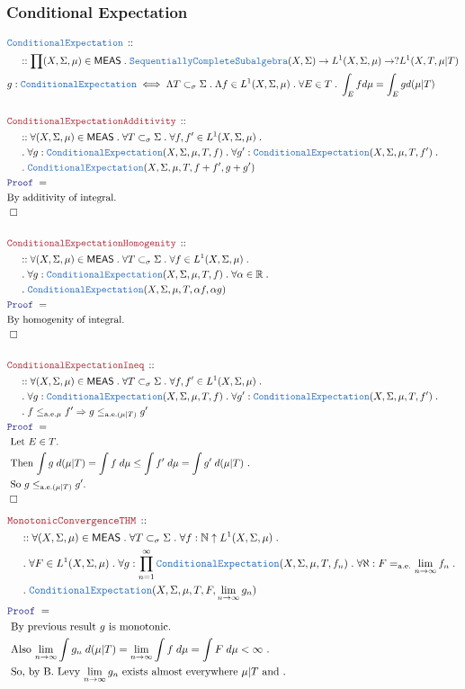 \documentclass[12pt]{scrartcl}
\newcommand{\TYPE}[1]{\textcolor{NavyBlue}{\mathtt{#1}}}
\newcommand{\LOGIC}[1]{\textcolor{Blue}{\mathtt{#1}}}
\newcommand{\THM}[1]{\textcolor{Maroon}{\mathtt{#1}}}
\renewcommand{\.}{\; . \;}
\newcommand{\Theorem}[2]{& \THM{#1} \, :: \, #2 \\ & \Proof = \\ }
\newcommand{\DeclareType}[2]{& \TYPE{#1} \, :: \, #2 \\}
\newcommand{\DefineType}[3]{& #1 : \TYPE{#2} \iff #3 \\}
\newcommand{\NewLine}{\\ & \kern 1pc}
\newcommand{\Page}[1]{ \begin{align*} #1 \end{align*}   }
\newcommand{\Imply}{\Rightarrow}
\newcommand{\Reals}{\mathbb{R} }
\newcommand{\Nat}{\mathbb{N} }
\newcommand{\QED}{\; \square}
\newcommand{\EndProof}{& \QED \\}
\newcommand{\Proof}{\LOGIC{Proof} \; }
\newcommand{\Explain}[1]{& \text{#1.} \\}
\renewcommand{\ae}{\mathrm{a.e.}}
\newcommand{\CE}{\TYPE{ConditionalExpectation}}
\newcommand{\MEAS}{\mathsf{MEAS}}
\begin{document}
\subsubsection{Conditional Expectation}
\Page{
	\DeclareType{\CE}
	{
		\NewLine ::		
		\prod (X,\Sigma,\mu) \in \MEAS \. 
		\TYPE{SequentiallyCompleteSubalgebra}(X,\Sigma)
		\to
		L^1(X,\Sigma,\mu)
		\to
		?L^1(X,T,\mu|T)
	}
	\DefineType{g}{\CE}{
		\Lambda T \subset_\sigma \Sigma \. 
		\Lambda f \in L^1(X,\Sigma,\mu) \. 
		\forall E \in T \. \int_E f d\mu = \int_E g d(\mu|T) 
	}
	\\
	\Theorem{ConditionalExpectationAdditivity}
	{
		\NewLine ::		
		\forall (X,\Sigma,\mu) \in \MEAS \.
		\forall T \subset_\sigma \Sigma \.
		\forall f,f' \in L^1(X,\Sigma,\mu) \. \NewLine \.
		\forall g : \CE(X,\Sigma,\mu,T,f) \.
		\forall g' : \CE(X,\Sigma,\mu,T,f') \. \NewLine \.
		\CE(X,\Sigma,\mu,T,f +f',g+g')	
	}
	\Explain{By additivity of integral}
	\EndProof
	\\
	\Theorem{ConditionalExpectationHomogenity}
	{
		\NewLine ::		
		\forall (X,\Sigma,\mu) \in \MEAS \.
		\forall T \subset_\sigma \Sigma \.
		\forall f \in L^1(X,\Sigma,\mu) \. \NewLine \.
		\forall g : \CE(X,\Sigma,\mu,T,f) \.
		\forall \alpha \in \Reals \. \NewLine \.
		\CE(X,\Sigma,\mu,T,\alpha f, \alpha g)	
	}
	\Explain{By homogenity of integral}
	\EndProof
	\\
	\Theorem{ConditionalExpectationIneq}
	{
		\NewLine ::		
		\forall (X,\Sigma,\mu) \in \MEAS \.
		\forall T \subset_\sigma \Sigma \.
		\forall f,f' \in L^1(X,\Sigma,\mu) \. \NewLine \.
		\forall g : \CE(X,\Sigma,\mu,T,f) \.
		\forall g' : \CE(X,\Sigma,\mu,T,f') \. \NewLine \.
		f \le_{\ae \mu} f' \Imply g \le_{\ae (\mu|T)} g'
	}
	\Explain{ Let $E \in T$}
	\Explain{
		Then $\int g \; d(\mu|T) =  \int f \; d\mu  \le   \int f' \; d\mu = \int g' \; d(\mu|T) $
	}
	\Explain{
		So $g \le_{\ae (\mu|T)} g'$}
	\EndProof
}\Page{
	\Theorem{MonotonicConvergenceTHM}
	{
		\NewLine ::		
		\forall (X,\Sigma,\mu) \in \MEAS \.
		\forall T \subset_\sigma \Sigma \.
		\forall f : \Nat \uparrow L^1(X,\Sigma,\mu) \. \NewLine \.
		\forall F \in L^1(X,\Sigma,\mu) \.
		\forall g : \prod^\infty_{n=1} \CE(X,\Sigma,\mu,T,f_n) \.
		\forall \aleph : F =_{\ae} \lim_{n \to \infty} f_n  \. \NewLine \.
		\CE(X,\Sigma,\mu,T,F,\lim_{n \to \infty} g_n)
	}
	\Explain{
		By previous result $g$ is monotonic}
	\Explain{
		Also
		$
			\lim_{n \to \infty} \int g_n \;d(\mu|T) =
			\lim_{n \to \infty} \int f \;d \mu = 
			\int F \; d\mu < \infty
		$
	}
	\Explain{
		So, by B.  Levy  $\lim_{n \to \infty} g_n$
		exists almost everywhere $\mu|T$ and 
}}
\end{document}
